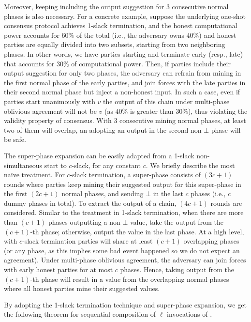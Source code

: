 Moreover, keeping including the output suggestion for 3 consecutive normal phases is also necessary.
%
For a concrete example, suppose the underlying one-shot consensus protocol achieves 1-slack termination, and the honest computational power accounts for $60\%$ of the total (i.e., the adversary owns $40\%$) and honest parties are equally divided into two subsets, starting from two neighboring phases.
%
In other words, we have parties starting and terminate early (resp., late) that accounts for $30\%$ of computational power.
%
Then, if parties include their output suggestion for only two phases, the adversary can refrain from mining in the first normal phase of the early parties, and join forces with the late parties in their second normal phase but inject a non-honest input.
%
In such a case, even if parties start unanimously with $v$ the output of this chain under multi-phase oblivious agreement will not be $v$ (as $40\%$ is greater than $30\%$), thus violating the validity property of consensus.
%
With 3 consecutive mining normal phases, at least two of them will overlap, an adopting an output in the second non-$\bot$ phase will be safe.

The super-phase expansion can be easily adapted from a 1-slack non-simultaneous start to $c$-slack, for any constant $c$.
%
We briefly describe the most na\"{i}ve treatment.
%
For $c$-slack termination, a super-phase consists of $(3c + 1)$ rounds where parties keep mining their suggested output for this super-phase in the first $(2c + 1)$ normal phases, and sending $\bot$ in the last $c$ phases (i.e., $c$ dummy phases in total).
%
To extract the output of a chain, $(4c + 1)$ rounds are considered.
%
Similar to the treatment in 1-slack termination, when there are more than $(c + 1)$ phases outputting  a non-$\bot$ value, take the output from the $(c + 1)$-th phase; otherwise, output the value in the last phase.
%
At a high level, with $c$-slack termination parties will share at least $(c + 1)$ overlapping phases (or any phase, as this implies some bad event happened so we do not expect an agreement).
%
Under multi-phase oblivious agreement, the adversary can join forces with early honest parties for at most $c$ phases.
%
Hence, taking output from the $(c + 1)$-th phase will result in a value from the overlapping normal phases where all honest parties mine their suggested values.

By adopting the 1-slack termination technique and super-phase expansion, we get the following theorem for sequential composition of $\ell$ invocations of \chainKingConsensus.

